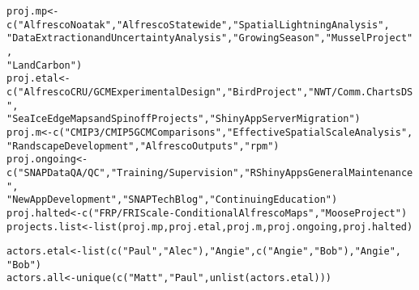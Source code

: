 \documentclass{article}\usepackage[]{graphicx}\usepackage[]{color}
\makeatletter
\newcommand{\hlstr}[1]{\textcolor[rgb]{0.863,0.196,0.184}{#1}}%
\newcommand{\hlstd}[1]{\textcolor[rgb]{0.514,0.58,0.588}{#1}}%
\newcommand{\hlkwb}[1]{\textcolor[rgb]{0.522,0.6,0}{#1}}%
\newcommand{\hlkwd}[1]{\textcolor[rgb]{0.576,0.631,0.631}{#1}}%
\newenvironment{kframe}{%
 \def\at@end@of@kframe{}%
 \ifinner\ifhmode%
  \def\at@end@of@kframe{\end{minipage}}%
  \begin{minipage}{\columnwidth}%
 \fi\fi%
 \def\FrameCommand##1{\hskip\@totalleftmargin \hskip-\fboxsep
 \colorbox{shadecolor}{##1}\hskip-\fboxsep
     \hskip-\linewidth \hskip-\@totalleftmargin \hskip\columnwidth}%
 \MakeFramed {\advance\hsize-\width
   \@totalleftmargin\z@ \linewidth\hsize
   \@setminipage}}%
 {\par\unskip\endMakeFramed%
 \at@end@of@kframe}
\newenvironment{knitrout}{}{} %
\makeatother
\begin{document}
\begin{knitrout}
\color{fgcolor}\begin{kframe}
\begin{alltt}
\hlstd{proj.mp} \hlkwb{<-} \hlkwd{c}\hlstd{(}\hlstr{"Alfresco Noatak"}\hlstd{,} \hlstr{"Alfresco Statewide"}\hlstd{,} \hlstr{"Spatial Lightning Analysis"}\hlstd{,}
    \hlstr{"Data Extraction and Uncertainty Analysis"}\hlstd{,} \hlstr{"Growing Season"}\hlstd{,} \hlstr{"Mussel Project"}\hlstd{,}
    \hlstr{"Land Carbon"}\hlstd{)}
\hlstd{proj.etal} \hlkwb{<-} \hlkwd{c}\hlstd{(}\hlstr{"Alfresco CRU/GCM Experimental Design"}\hlstd{,} \hlstr{"Bird Project"}\hlstd{,} \hlstr{"NWT/Comm. Charts DS"}\hlstd{,}
    \hlstr{"Sea Ice Edge Maps and Spinoff Projects"}\hlstd{,} \hlstr{"Shiny App Server Migration"}\hlstd{)}
\hlstd{proj.m} \hlkwb{<-} \hlkwd{c}\hlstd{(}\hlstr{"CMIP3/CMIP5 GCM Comparisons"}\hlstd{,} \hlstr{"Effective Spatial Scale Analysis"}\hlstd{,}
    \hlstr{"Randscape Development"}\hlstd{,} \hlstr{"Alfresco Outputs"}\hlstd{,} \hlstr{"rpm"}\hlstd{)}
\hlstd{proj.ongoing} \hlkwb{<-} \hlkwd{c}\hlstd{(}\hlstr{"SNAP Data QA/QC"}\hlstd{,} \hlstr{"Training/Supervision"}\hlstd{,} \hlstr{"R Shiny Apps General Maintenance"}\hlstd{,}
    \hlstr{"New App Development"}\hlstd{,} \hlstr{"SNAP Tech Blog"}\hlstd{,} \hlstr{"Continuing Education"}\hlstd{)}
\hlstd{proj.halted} \hlkwb{<-} \hlkwd{c}\hlstd{(}\hlstr{"FRP/FRI Scale-Conditional Alfresco Maps"}\hlstd{,} \hlstr{"Moose Project"}\hlstd{)}
\hlstd{projects.list} \hlkwb{<-} \hlkwd{list}\hlstd{(proj.mp, proj.etal, proj.m, proj.ongoing, proj.halted)}
\end{alltt}
\end{kframe}
\end{knitrout}

\begin{knitrout}
\color{fgcolor}\begin{kframe}
\begin{alltt}
\hlstd{actors.etal} \hlkwb{<-} \hlkwd{list}\hlstd{(}\hlkwd{c}\hlstd{(}\hlstr{"Paul"}\hlstd{,} \hlstr{"Alec"}\hlstd{),} \hlstr{"Angie"}\hlstd{,} \hlkwd{c}\hlstd{(}\hlstr{"Angie"}\hlstd{,} \hlstr{"Bob"}\hlstd{),} \hlstr{"Angie"}\hlstd{,}
    \hlstr{"Bob"}\hlstd{)}
\hlstd{actors.all} \hlkwb{<-} \hlkwd{unique}\hlstd{(}\hlkwd{c}\hlstd{(}\hlstr{"Matt"}\hlstd{,} \hlstr{"Paul"}\hlstd{,} \hlkwd{unlist}\hlstd{(actors.etal)))}
\end{alltt}
\end{kframe}
\end{knitrout}
\end{document}
